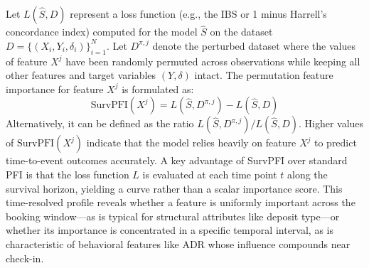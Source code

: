 \documentclass[pdflatex,sn-mathphys-ay]{sn-jnl}
\theoremstyle{thmstyleone}%
\theoremstyle{thmstyletwo}%
\theoremstyle{thmstylethree}%
\begin{document}
Let $L(\hat{S}, D)$ represent a loss function (e.g., the IBS or 1 minus Harrell's concordance index) computed for the model $\hat{S}$ on the dataset $D = \{(X_i, Y_i, \delta_i)\}_{i=1}^N$. Let $D^{\pi, j}$ denote the perturbed dataset where the values of feature $X^j$ have been randomly permuted across observations while keeping all other features and target variables $(Y, \delta)$ intact. The permutation feature importance for feature $X^j$ is formulated as:
\begin{equation}
\text{SurvPFI}(X^j) = L(\hat{S}, D^{\pi, j}) - L(\hat{S}, D)
\end{equation}
Alternatively, it can be defined as the ratio $L(\hat{S}, D^{\pi, j}) / L(\hat{S}, D)$. Higher values of $\text{SurvPFI}(X^j)$ indicate that the model relies heavily on feature $X^j$ to predict time-to-event outcomes accurately. A key advantage of SurvPFI over standard PFI is that the loss function $L$ is evaluated at each time point $t$ along the survival horizon, yielding a curve rather than a scalar importance score. This time-resolved profile reveals whether a feature is uniformly important across the booking window—as is typical for structural attributes like deposit type—or whether its importance is concentrated in a specific temporal interval, as is characteristic of behavioral features like ADR whose influence compounds near check-in.
\end{document}

